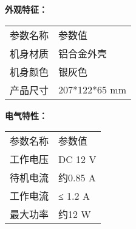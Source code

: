 \noindent\xiaosi\textbf{外观特征：}
\vspace{0.1cm}
\song
\begin{table}[H]
\normalsize
{}
\begin{tabular}{m{6.5cm}|m{6.5cm}}
\rowcolor{myblue}
\color{white}参数名称& \color{white}参数值\\\arrayrulecolor{tabcolor}\midrule[1.2pt]
机身材质& 铝合金外壳\\\arrayrulecolor{tabcolor}\midrule[1.2pt]
机身颜色& 银灰色\\\arrayrulecolor{tabcolor}\midrule[1.2pt]
产品尺寸& 207*122*65 mm\\
\end{tabular}
\end{table}


\vspace{0.4cm}
\noindent\xiaosi\textbf{电气特性：}
\vspace{0.1cm}
\song
\begin{table}[H]
\normalsize
{}
\begin{tabular}{m{6.5cm}|m{6.5cm}}
\rowcolor{myblue}
\color{white}参数名称& \color{white}参数值\\\arrayrulecolor{tabcolor}\midrule[1.2pt]
工作电压& DC 12 V\\\arrayrulecolor{tabcolor}\midrule[1.2pt]
待机电流& 约0.85 A\\\arrayrulecolor{tabcolor}\midrule[1.2pt]
工作电流& ≤ 1.2 A\\\arrayrulecolor{tabcolor}\midrule[1.2pt]
最大功率& 约12 W\\
\end{tabular}
\end{table}


